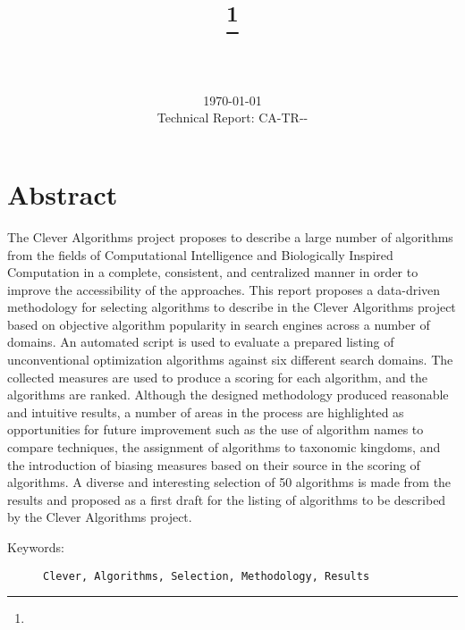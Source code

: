 \documentclass[a4paper, 11pt]{article}
\title{{\myreporttitle}\footnote{\myreportlicense}}
\author{\myreportauthor\\{\myreportemail}\\\small\myreportproject}
\date{\today\\{\small{Technical Report: CA-TR-{\myreportdate}-\myreportversion}}}
\begin{document}
\maketitle

\section*{Abstract} 
The Clever Algorithms project proposes to describe a large number of algorithms from the fields of Computational Intelligence and Biologically Inspired Computation in a complete, consistent, and centralized manner in order to improve the accessibility of the approaches.
This report proposes a data-driven methodology for selecting algorithms to describe in the Clever Algorithms project based on objective algorithm popularity in search engines across a number of domains. 
An automated script is used to evaluate a prepared listing of unconventional optimization algorithms against six different search domains. The collected measures are used to produce a scoring for each algorithm, and the algorithms are ranked.
Although the designed methodology produced reasonable and intuitive results, a number of areas in the process are highlighted as opportunities for future improvement such as the use of algorithm names to compare techniques, the assignment of algorithms to taxonomic kingdoms, and the introduction of biasing measures based on their source in the scoring of algorithms.
A diverse and interesting selection of 50 algorithms is made from the results and proposed as a first draft for the listing of algorithms to be described by the Clever Algorithms project. 

\begin{description}
	\item[Keywords:] {\small\texttt{Clever, Algorithms, Selection, Methodology, Results}}
\end{description} 

\end{document}
